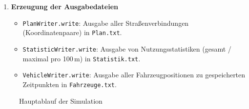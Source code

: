 \begin{enumerate}
  \item \textbf{Erzeugung der Ausgabedateien}
  \begin{itemize}
    \item \texttt{PlanWriter.write}: Ausgabe aller Straßenverbindungen (Koordinatenpaare) in \texttt{Plan.txt}.
    \item \texttt{StatisticWriter.write}: Ausgabe von Nutzungsstatistiken (gesamt / maximal pro 100\,m) in \texttt{Statistik.txt}.
    \item \texttt{VehicleWriter.write}: Ausgabe aller Fahrzeugpositionen zu gespeicherten Zeitpunkten in \texttt{Fahrzeuge.txt}.
  \end{itemize}
\end{enumerate}

\begin{figure}[h!]
    \centering
    \caption{Hauptablauf der Simulation}
\end{figure}



